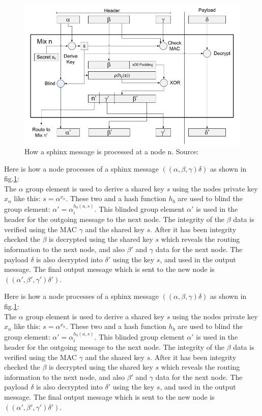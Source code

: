 \documentclass[informationsecurity]{gucmasterproject}
\begin{document}
\begin{figure}[h]
    \centering
    \includegraphics[width=12cm]{figs/sphinx.png}
    \caption{ How a sphinx message is processed at a node n. Source: \cite{danezis2009sphinx}}
    \label{fig:sphinx}
\end{figure}

\noindent
Here is how a node processes of a sphinx message $((\alpha, \beta, \gamma)\delta)$ as shown in fig.\ref{fig:sphinx}:\\
The $\alpha$ group element is used to derive a shared key $s$ using the nodes private key $x_n$ like this: $s = \alpha^{x_n}$.
These two and a hash function $h_b$ are used to blind the group element: $\alpha'= \alpha_i^{h_b(a,s)}$.
This blinded group element $\alpha'$ is used in the header for the outgoing message to the next node.
The integrity of the $\beta$ data is verified using the MAC $\gamma$ and the shared key $s$.
After it has been integrity checked the $\beta$ is decrypted using the shared key $s$ which reveals the routing information to the next node, and also $\beta'$ and $\gamma$ data for the next node. 
The payload $\delta$ is also decrypted into $\delta'$ using the key $s$, and used in the output message.
The final output message which is sent to the new node is $((\alpha', \beta', \gamma')\delta')$.

Here is how a node processes of a sphinx message $((\alpha, \beta, \gamma)\delta)$ as shown in fig.\ref{fig:sphinx}:\\
The $\alpha$ group element is used to derive a shared key $s$ using the nodes private key $x_n$ like this: $s = \alpha^{x_n}$.
These two and a hash function $h_b$ are used to blind the group element: $\alpha'= \alpha_i^{h_b(a,s)}$.
This blinded group element $\alpha'$ is used in the header for the outgoing message to the next node.
The integrity of the $\beta$ data is verified using the MAC $\gamma$ and the shared key $s$.
After it has been integrity checked the $\beta$ is decrypted using the shared key $s$ which reveals the routing information to the next node, and also $\beta'$ and $\gamma$ data for the next node. 
The payload $\delta$ is also decrypted into $\delta'$ using the key $s$, and used in the output message.
The final output message which is sent to the new node is $((\alpha', \beta', \gamma')\delta')$.





%

\end{document}
